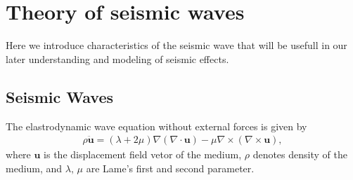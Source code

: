 \section{Theory of seismic waves} \label{sec:31}
Here we introduce characteristics of the seismic wave that will be usefull in our later understanding and modeling of seismic effects.



\subsection{Seismic Waves}
The elastrodynamic wave equation without external forces is given by 
\begin{eqnarray}\label{eq:eq_1}
  \rho{\bm{\ddot{u}}} = (\lambda+2\mu)\nabla(\nabla\cdot\bm{u}) - \mu\nabla\times(\nabla\times\bm{u}),
\end{eqnarray}
where $\bm{u}$ is the displacement field vetor of the medium, $\rho$ denotes density of the medium, and $\lambda,\,\mu$ are Lame's first and second parameter.



